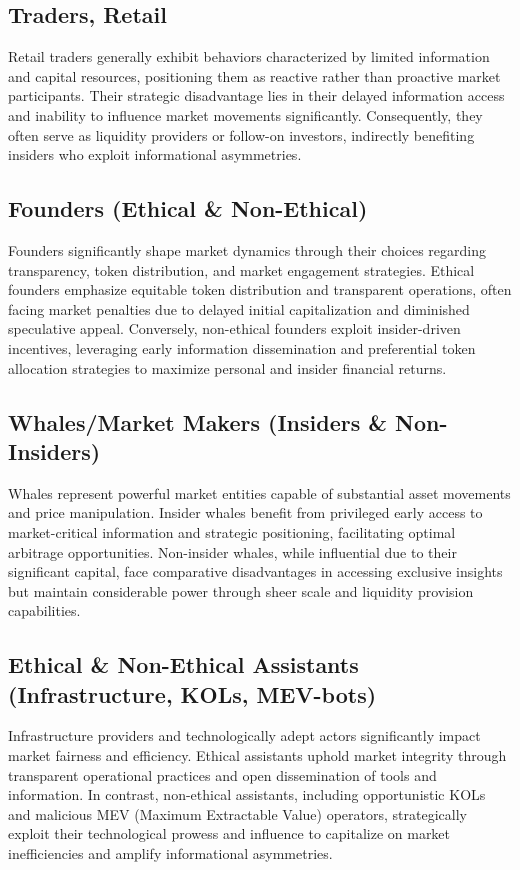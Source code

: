 \documentclass{article}
\begin{document}
\subsection{Traders, Retail}
Retail traders generally exhibit behaviors characterized by limited information and capital resources, positioning them as reactive rather than proactive market participants. Their strategic disadvantage lies in their delayed information access and inability to influence market movements significantly. Consequently, they often serve as liquidity providers or follow-on investors, indirectly benefiting insiders who exploit informational asymmetries.

\subsection{Founders (Ethical & Non-Ethical)}
Founders significantly shape market dynamics through their choices regarding transparency, token distribution, and market engagement strategies. Ethical founders emphasize equitable token distribution and transparent operations, often facing market penalties due to delayed initial capitalization and diminished speculative appeal. Conversely, non-ethical founders exploit insider-driven incentives, leveraging early information dissemination and preferential token allocation strategies to maximize personal and insider financial returns.

\subsection{Whales/Market Makers (Insiders & Non-Insiders)}
Whales represent powerful market entities capable of substantial asset movements and price manipulation. Insider whales benefit from privileged early access to market-critical information and strategic positioning, facilitating optimal arbitrage opportunities. Non-insider whales, while influential due to their significant capital, face comparative disadvantages in accessing exclusive insights but maintain considerable power through sheer scale and liquidity provision capabilities.

\subsection{Ethical & Non-Ethical Assistants (Infrastructure, KOLs, MEV-bots)}
Infrastructure providers and technologically adept actors significantly impact market fairness and efficiency. Ethical assistants uphold market integrity through transparent operational practices and open dissemination of tools and information. In contrast, non-ethical assistants, including opportunistic KOLs and malicious MEV (Maximum Extractable Value) operators, strategically exploit their technological prowess and influence to capitalize on market inefficiencies and amplify informational asymmetries.
\end{document}
